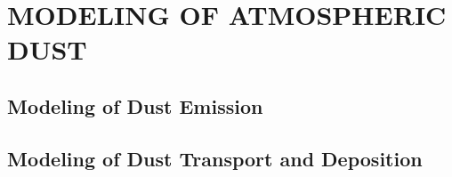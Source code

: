 \chapter{MODELING OF ATMOSPHERIC DUST}

\section{Modeling of Dust Emission}
\section{Modeling of Dust Transport and Deposition}

